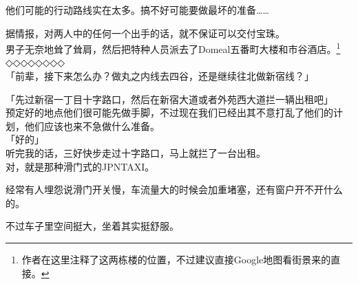 他们可能的行动路线实在太多。搞不好可能要做最坏的准备……

据情报，对两人中的任何一个出手的话，就不保证可以交付宝珠。\\

男子无奈地耸了耸肩，然后把特种人员派去了Domeal五番町大楼和市谷酒店。\footnote{作者在这里注释了这两栋楼的位置，不过建议直接Google地图看街景来的直接。}\\

◇◇◇◇◇◇◇◇\\

「前辈，接下来怎么办？做丸之内线去四谷，还是继续往北做新宿线？」

「先过新宿一丁目十字路口，然后在新宿大道或者外苑西大道拦一辆出租吧」\\

预定好的地点他们很可能先做手脚，不过现在我们已经出其不意打乱了他们的计划，他们应该也来不急做什么准备。\\

「好的」\\

听完我的话，三好快步走过十字路口，马上就拦了一台出租。\\

对，就是那种滑门式的JPNTAXI。

经常有人埋怨说滑门开关慢，车流量大的时候会加重堵塞，还有窗户开不开什么的。

不过车子里空间挺大，坐着其实挺舒服。\\

